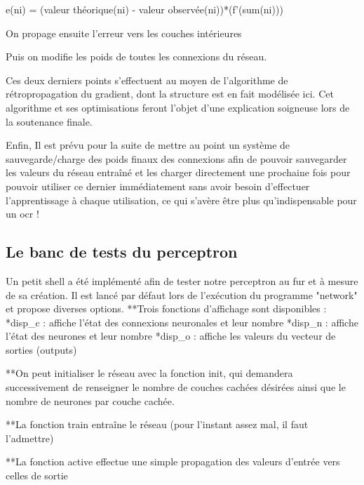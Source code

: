 \documentclass[a4paper,10pt]{report}
\begin{document}
e(ni) = (valeur théorique(ni) - valeur observée(ni))*(f'(sum(ni)))

On propage ensuite l'erreur vers les couches intérieures 

Puis on modifie les poids de toutes les connexions du réseau.

Ces deux derniers points s'effectuent au moyen de l'algorithme de
r\'etropropagation du gradient, dont la structure est en fait
mod\'elis\'ee ici. Cet algorithme et ses optimisations feront l'objet
d'une explication soigneuse lors de la soutenance finale.


Enfin, Il est pr\'evu pour la suite de mettre au point un syst\`eme de
sauvegarde/charge des poids finaux des connexions afin de pouvoir
sauvegarder les valeurs du r\'eseau entra\^iné et les charger
directement une prochaine fois pour pouvoir utiliser ce dernier
imm\'ediatement sans avoir besoin d'effectuer l'apprentissage \`a chaque
utilisation, ce qui s'av\`ere \^etre plus qu'indispensable pour un ocr !




\subsection{Le banc de tests du perceptron} %
\label{subsec:le_banc_de_tests_du_perceptron}

Un petit shell a \'et\'e impl\'ement\'e afin de tester notre perceptron
au fur et \`a mesure de sa cr\'eation. Il est lanc\'e par d\'efaut lors
de l'ex\'ecution du programme "network" et propose diverses
options. 
**Trois fonctions d'affichage sont disponibles : 
*disp_c : affiche l'\'etat des connexions neuronales et leur nombre
*disp_n : affiche l'\'etat des neurones et leur nombre
*disp_o : affiche les valeurs du vecteur de sorties (outputs)

**On peut initialiser le r\'eseau avec la fonction init, qui demandera
successivement de renseigner le nombre de couches cach\'ees d\'esir\'ees
ainsi que le nombre de neurones par couche cach\'ee.

**La fonction train entra\^ine le r\'eseau (pour l'instant assez mal, il
faut l'admettre) 

**La fonction active effectue une simple propagation des valeurs
d'entr\'ee vers celles de sortie
\end{document}

